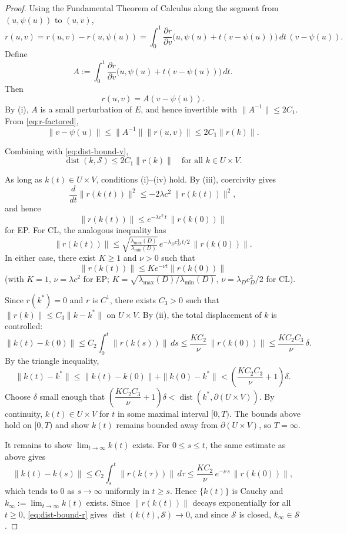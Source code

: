 \documentclass[10pt,a4paper]{amsart}
\begin{document}
\begin{proof}
Using the Fundamental Theorem of Calculus along the segment from $(u,\psi(u))$ to $(u,v)$,
\[
r(u,v)=r(u,v) - r(u,\psi(u))
= 
\int_0^1
\frac{\partial r}{\partial v}\big(u, \psi(u) + t(v-\psi(u))\big)\, dt \,(v-\psi(u)).
\]
Define
\[
A :=
\int_0^1
\frac{\partial r}{\partial v}\big(u, \psi(u) + t(v-\psi(u))\big)\, dt.
\]
Then
\begin{equation}
r(u,v) = A (v-\psi(u)).
\label{eq:r-factored}
\end{equation}
By (i), $A$ is a small perturbation of $E$, and hence invertible with $\|A^{-1}\| \le 2C_1$. From \eqref{eq:r-factored},
\[
\|v-\psi(u)\| \le \|A^{-1}\| \|r(u,v)\| \le 2C_1 \|r(k)\|.
\]

Combining with \eqref{eq:dist-bound-v},
\begin{equation}
\operatorname{dist}(k,\mathcal S) \le 2C_1 \|r(k)\|
\quad \text{for all } k \in U \times V.
\label{eq:dist-bound-r}
\end{equation}

As long as $k(t) \in U \times V$, conditions (i)--(iv) hold. By (iii), coercivity gives
\[
\dfrac{d}{dt}\|r(k(t))\|^2 \le -2\lambda c^2\, \|r(k(t))\|^2,
\]
and hence
\[
\|r(k(t))\| \le e^{-\lambda c^2\, t}\, \|r(k(0))\|
\]
for EP. For CL, the analogous inequality has
\[\|r(k(t))\| \le \sqrt{\tfrac{\lambda_{\max}(D)}{\lambda_{\min}(D)}}\,e^{-\lambda_D c_D^2\, t/2}\, \|r(k(0))\|.\]
In either case, there exist $K\ge 1$ and $\nu>0$ such that \[\|r(k(t))\| \le Ke^{-\nu t}\|r(k(0))\|\] (with $K=1,\,\nu=\lambda c^2$ for EP; $K=\sqrt{\lambda_{\max}(D)/\lambda_{\min}(D)},\,\nu = \lambda_D c_D^2/2$ for CL).          

Since $r(k^*) = 0$ and $r$ is $C^1$, there exists $C_3 > 0$ such that $\|r(k)\| \leq C_3\|k - k^*\|$ on $U \times V$. By (ii), the total displacement of $k$ is controlled:
\[
\|k(t) - k(0)\| \le C_2 \int_0^t \|r(k(s))\|\, ds \le \dfrac{KC_2}{\nu}\, \|r(k(0))\| \leq \dfrac{KC_2 C_3}{\nu}\, \delta.
\]
By the triangle inequality,
\[
\|k(t) - k^*\| \leq \|k(t) - k(0)\| + \|k(0) - k^*\| < \left(\dfrac{KC_2 C_3}{\nu}+1\right)\delta.
\]
Choose $\delta$ small enough that $\left(\dfrac{KC_2 C_3}{\nu}+1\right)\delta < \operatorname{dist}(k^*, \partial(U \times V))$. By continuity, $k(t) \in U \times V$ for $t$ in some maximal interval $[0,T)$. The bounds above hold on $[0,T)$ and show $k(t)$ remains bounded away from $\partial(U \times V)$, so $T = \infty$.

It remains to show $\lim_{t \to \infty} k(t)$ exists. For $0 \le s \le t$, the same estimate as above gives
\[
\|k(t) - k(s)\| \le C_2 \int_s^t \|r(k(\tau))\|\, d\tau
\le \dfrac{KC_2}{\nu}\, e^{-\nu\, s}\, \|r(k(0))\|,
\]
which tends to $0$ as $s \to \infty$ uniformly in $t \ge s$. Hence $\{k(t)\}$ is Cauchy and $k_\infty := \lim_{t \to \infty} k(t)$ exists. Since $\|r(k(t))\|$ decays exponentially for all $t \ge 0$, \eqref{eq:dist-bound-r} gives $\operatorname{dist}(k(t),\mathcal S) \to 0$, and since $\mathcal{S}$ is closed, $k_\infty \in \mathcal{S}$.
\end{proof}
\end{document}
